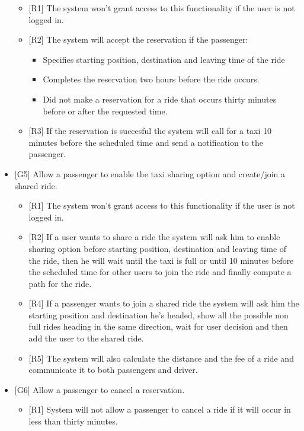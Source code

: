 \documentclass[a4paper, 12pt, titlepage]{article}
\begin{document}
\begin{itemize}
			\begin{itemize}
				\item {[R1]} The system won't grant access to this functionality if the user is not logged in.
				\item {[R2]} The system will accept the reservation if the passenger: 
				\begin{itemize}
					\item Specifies starting position, destination and leaving time of the ride
					\item Completes the reservation two hours before the ride occurs.
					\item Did not make a reservation for a ride that occurs thirty minutes before or after the requested time.					
				\end{itemize}
				\item {[R3]} If the reservation is succesful the system will call for a taxi 10 minutes before the scheduled time and send a notification to the passenger.
			\end{itemize}
		\item {[G5]} Allow a passenger to enable the taxi sharing option and create/join a shared ride.
			\begin{itemize}
				\item {[R1]} The system won't grant access to this functionality if the user is not logged in.
				\item {[R2]} If a user wants to share a ride the system will ask him to enable sharing option before starting position, destination and leaving time of the ride, then he will wait until the taxi is full or until 10 minutes before the scheduled time for other users to join the ride and finally compute a path for the ride.
				\item {[R4]} If a passenger wants to join a shared ride the system will ask him the starting position and destination he's headed, show all the possible non full rides heading in the same direction, wait for user decision and then add the user to the shared ride.
				\item {[R5]} The system will also calculate the distance and the fee of a ride and communicate it to both passengers and driver.
			\end{itemize}
		\item {[G6]} Allow a passenger to cancel a reservation.
			\begin{itemize}
				\item {[R1]} System will not allow a passenger to cancel a ride if it will occur in less than thirty minutes.

\end{itemize}
\end{itemize}
\end{document}
